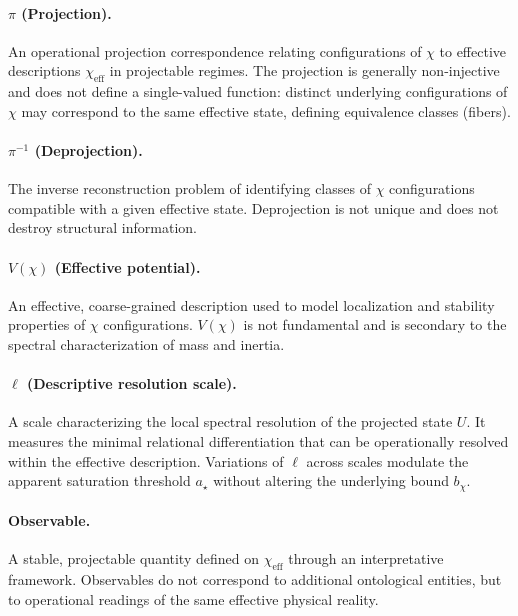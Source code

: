   \paragraph{\texorpdfstring{$\pi$}{π} (Projection).}
    An operational projection correspondence relating configurations of $\chi$
    to effective descriptions $\chi_{\mathrm{eff}}$ in projectable regimes.
    The projection is generally non-injective and does not define a single-valued
    function: distinct underlying configurations of $\chi$ may correspond to
    the same effective state, defining equivalence classes (fibers).

  \paragraph{\texorpdfstring{$\pi^{-1}$}{π⁻¹} (Deprojection).}
    The inverse reconstruction problem of identifying classes of $\chi$
    configurations compatible with a given effective state.
    Deprojection is not unique and does not destroy structural information.

  \paragraph{\texorpdfstring{$V(\chi)$}{V(χ)} (Effective potential).}
    An effective, coarse-grained description used to model localization and
    stability properties of $\chi$ configurations.
    $V(\chi)$ is not fundamental and is secondary to the spectral characterization
    of mass and inertia.

  \paragraph{\texorpdfstring{$\ell$}{ℓ} (Descriptive resolution scale).}
    A scale characterizing the local spectral resolution of the projected
    state $U$.
    It measures the minimal relational differentiation that can be
    operationally resolved within the effective description.
    Variations of $\ell$ across scales modulate the apparent saturation
    threshold $a_{\star}$ without altering the underlying bound $b_{\chi}$.

  \paragraph{Observable.}
    A stable, projectable quantity defined on $\chi_{\mathrm{eff}}$ through an
    interpretative framework.
    Observables do not correspond to additional ontological entities, but to
    operational readings of the same effective physical reality.

